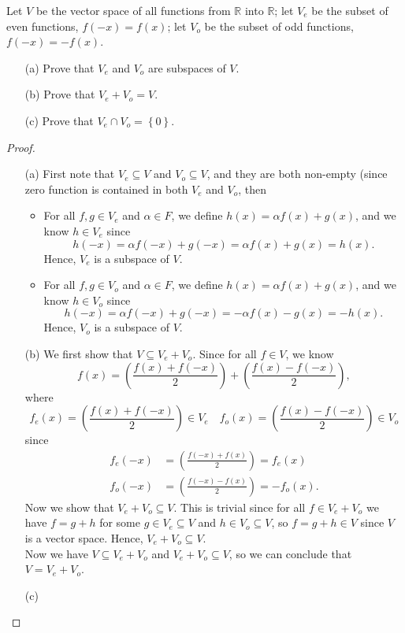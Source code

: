 \begin{problem}
Let \(V\) be the vector space of all functions from \(\mathbb{R} \)  into \(\mathbb{R} \); let \(V_e\) be the subset of even functions, \(f(-x) = f(x)\); let \(V_o\) be the subset of odd functions, \(f(-x) = -f(x)\).
\begin{itemize}
    \item [(a)] Prove that \(V_e\) and \(V_o\) are subspaces of \(V\). 
    \item [(b)] Prove that \(V_e + V_o = V\). 
    \item [(c)] Prove that \(V_e \cap V_o = \left\{ 0 \right\} \).     
\end{itemize}
\end{problem}
\begin{proof}
    \vphantom{text}
\begin{itemize}
    \item [(a)] First note that \(V_e \subseteq V\) and \(V_o \subseteq V\), and they are both non-empty (since zero function is contained in both \(V_e\) and \(V_o\), then   
    \begin{itemize}[\(\bullet\) ]
        \item For all \(f, g \in V_e\) and \(\alpha \in F\), we define \(h(x) = \alpha f(x) + g(x)\), and we know \(h \in V_e\) since
        \[
            h(-x) = \alpha f(-x) + g(-x) = \alpha f(x) + g(x) = h(x).
        \]
        Hence, \(V_e\) is a subspace of \(V\).  
        \item For all \(f, g \in V_o\) and \(\alpha \in F\), we define \(h(x) = \alpha f(x) + g(x)\), and we know \(h \in V_o\) since
        \[
            h(-x) = \alpha f(-x) + g(-x) = -\alpha f(x) - g(x) = -h(x).
        \]
        Hence, \(V_o\) is a subspace of \(V\).  
    \end{itemize}
    \item [(b)] We first show that \(V \subseteq V_e + V_o\). Since for all \(f \in V\), we know 
    \[
        f(x) = \left( \frac{f(x) + f(-x)}{2} \right) + \left( \frac{f(x) - f(-x)}{2} \right), 
    \]  where 
    \[
        f_e(x) = \left( \frac{f(x) + f(-x)}{2} \right) \in V_e \quad f_o(x) = \left( \frac{f(x) - f(-x)}{2} \right) \in V_o
    \] since 
    \begin{align*}
        f_e(-x) &= \left( \frac{f(-x) + f(x)}{2} \right) = f_e(x) \\
        f_o(-x) &= \left( \frac{f(-x) - f(x)}{2} \right) = -f_o(x) .
    \end{align*}
    Now we show that \(V_e + V_o \subseteq V\). This is trivial since for all \(f \in V_e + V_o\) we have \(f = g + h\) for some \(g \in V_e \subseteq V\) and \(h \in V_o \subseteq V\), so \(f = g+h \in V\) since \(V\) is a vector space. Hence, \(V_e + V_o \subseteq V\). \\
    Now we have \(V \subseteq V_e + V_o\) and \(V_e + V_o \subseteq V\), so we can conclude that \(V = V_e + V_o\).   
    \item [(c)]
\end{itemize}   
\end{proof}

